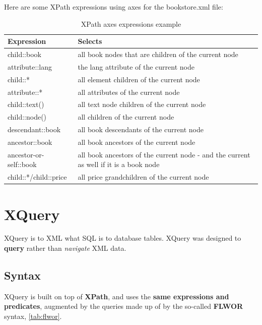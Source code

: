 \documentclass{pgnotes}
\begin{document}
Here are some XPath expressions using axes for the bookstore.xml file:

\begin{table}[htbp]
  \begin{tabularx}{1.0\linewidth}{l X}
    \toprule
    \textbf{Expression} & \textbf{Selects} \\
    \midrule
    child::book & 	 all book nodes that are children of the current node \\
    attribute::lang &	 the lang attribute of the current node \\
    child::* &	 all element children of the current node \\
    attribute::* &	 all attributes of the current node \\
    child::text() &	 all text node children of the current node \\ 
    child::node() &	 all children of the current node \\ 
    descendant::book &	 all book descendants of the current node \\ 
    ancestor::book &	 all book ancestors of the current node \\ 
    ancestor-or-self::book &	 all book ancestors of the current node - and the current as well if it is a book node \\
    child::*/child::price &	 all price grandchildren of the current node\\
    \bottomrule
  \end{tabularx}
  \caption{XPath axes expressions example}
  \label{tab:xpath-axes-example}
\end{table}


\section{XQuery}

XQuery is to XML what SQL is to database tables.
XQuery was designed to \textbf{query} rather than \textit{navigate} XML data.

\subsection{Syntax}

XQuery is built on top of \textbf{XPath}, and uses the \textbf{same expressions and predicates},  
augmented by the queries made up of by the so-called \textbf{FLWOR} syntax, \autoref{tab:flwor}.
\end{document}
